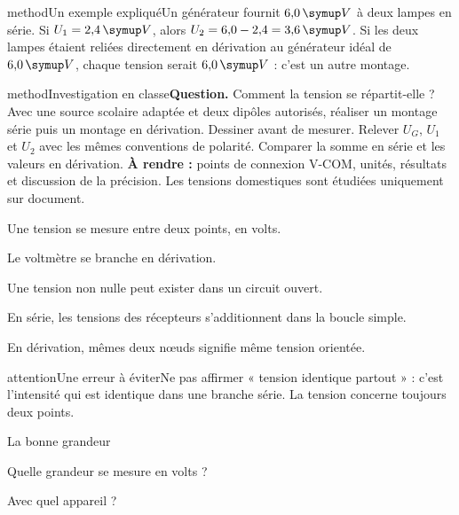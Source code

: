 \begin{pcEncadre}{method}{Un exemple expliqué}Un générateur fournit $6{,}0\unite V$ à deux lampes en série. Si $U_1=2{,}4\unite V$, alors $U_2=6{,}0-2{,}4=3{,}6\unite V$. Si les deux lampes étaient reliées directement en dérivation au générateur idéal de $6{,}0\unite V$, chaque tension serait $6{,}0\unite V$ : c’est un autre montage.\end{pcEncadre}
\label{activite-15}
\begin{pcEncadre}{method}{Investigation en classe}\textbf{Question.} Comment la tension se répartit-elle ? Avec une source scolaire adaptée et deux dipôles autorisés, réaliser un montage série puis un montage en dérivation. Dessiner avant de mesurer. Relever $U_G$, $U_1$ et $U_2$ avec les mêmes conventions de polarité. Comparer la somme en série et les valeurs en dérivation. \textbf{À rendre :} points de connexion V-COM, unités, résultats et discussion de la précision. Les tensions domestiques sont étudiées uniquement sur document.\end{pcEncadre}
\begin{questions}
\item Une tension se mesure entre deux points, en volts.
\item Le voltmètre se branche en dérivation.
\item Une tension non nulle peut exister dans un circuit ouvert.
\item En série, les tensions des récepteurs s’additionnent dans la boucle simple.
\item En dérivation, mêmes deux nœuds signifie même tension orientée.
\end{questions}
\begin{pcEncadre}{attention}{Une erreur à éviter}Ne pas affirmer « tension identique partout » : c’est l’intensité qui est identique dans une branche série. La tension concerne toujours deux points.\end{pcEncadre}
\pcGrille
\clearpage{}
\par\noindent\begin{minipage}{\linewidth}
\begin{exercice}[1]{La bonne grandeur}
\begin{questions}
\item Quelle grandeur se mesure en volts ?
\item Avec quel appareil ?
\end{questions}
\end{exercice}
\end{minipage}
